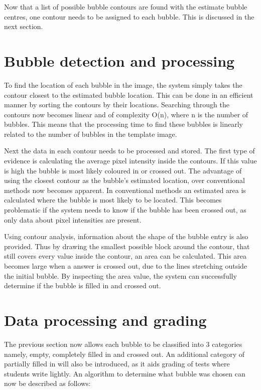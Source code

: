 Now that a list of possible bubble contours are found with the estimate bubble centres, one contour needs to be assigned to each bubble. This is discussed in the next section.

\section{Bubble detection and processing}
To find the location of each bubble in the image, the system simply takes the contour closest to the estimated bubble location. This can be done in an efficient manner by sorting the contours by their locations. Searching through the contours now becomes linear and of complexity O(n), where n is the number of bubbles. This means that the processing time to find these bubbles is linearly related to the number of bubbles in the template image. 

Next the data in each contour needs to be processed and stored. The first type of evidence is calculating the average pixel intensity inside the contours. If this value is high the bubble is most likely coloured in or crossed out. The advantage of using the closest contour as the bubble's estimated location, over conventional methods now becomes apparent. In conventional methods an estimated area is calculated where the bubble is most likely to be located. This becomes problematic if the system needs to know if the bubble has been crossed out, as only data about pixel intensities are present. 

Using contour analysis, information about the shape of the bubble entry is also provided. Thus by drawing the smallest possible block around the contour, that still covers every value inside the contour, an area can be calculated. This area becomes large when a answer is crossed out, due to the lines stretching outside the initial bubble. By inspecting the area value, the system can successfully determine if the bubble is filled in and crossed out.

\section{Data processing and grading}

The previous section now allows each bubble to be classified into 3 categories namely, empty, completely filled in and crossed out. An additional category of partially filled in will also be introduced, as it aids grading of tests where students write lightly. An algorithm to determine what bubble was chosen can now be described as follows:

